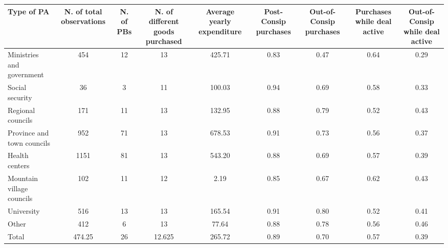 {
\def\sym#1{\ifmmode^{#1}\else\(^{#1}\)\fi}
\begin{tabular}{l*{1}{cccccccc}}
\hline\hline
Type of PA                    &N. of total observations&   N. of PBs&N. of different goods purchased&Average yearly expenditure&Post-Consip purchases&Out-of-Consip purchases&Purchases while deal active&Out-of-Consip while deal active\\
\hline
Ministries and government     &         454&          12&          13&      425.71&        0.83&        0.47&        0.64&        0.29\\
Social security               &          36&           3&          11&      100.03&        0.94&        0.69&        0.58&        0.33\\
Regional councils             &         171&          11&          13&      132.95&        0.88&        0.79&        0.52&        0.43\\
Province and town councils    &         952&          71&          13&      678.53&        0.91&        0.73&        0.56&        0.37\\
Health centers                &        1151&          81&          13&      543.20&        0.88&        0.69&        0.57&        0.39\\
Mountain village councils     &         102&          11&          12&        2.19&        0.85&        0.67&        0.62&        0.43\\
University                    &         516&          13&          13&      165.54&        0.91&        0.80&        0.52&        0.41\\
Other                         &         412&           6&          13&       77.64&        0.88&        0.78&        0.56&        0.46\\
Total                         &      474.25&          26&      12.625&      265.72&        0.89&        0.70&        0.57&        0.39\\
\hline\hline
\end{tabular}
}
